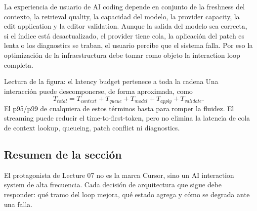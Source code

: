 La experiencia de usuario de AI coding depende en conjunto de la freshness del contexto, la retrieval quality, la capacidad del modelo, la provider capacity, la edit application y la editor validation. Aunque la salida del modelo sea correcta, si el índice está desactualizado, el provider tiene cola, la aplicación del patch es lenta o los diagnostics se traban, el usuario percibe que el sistema falla. Por eso la optimización de la infraestructura debe tomar como objeto la interaction loop completa.


\begin{knowledgebox}{Lectura de la figura: el latency budget pertenece a toda la cadena}
Una interacción puede descomponerse, de forma aproximada, como
\[
T_{total}=T_{context}+T_{queue}+T_{model}+T_{apply}+T_{validate}.
\]
El p95/p99 de cualquiera de estos términos basta para romper la fluidez. El streaming puede reducir el time-to-first-token, pero no elimina la latencia de cola de context lookup, queueing, patch conflict ni diagnostics.
\end{knowledgebox}


\subsection{Resumen de la sección}

El protagonista de Lecture 07 no es la marca Cursor, sino un AI interaction system de alta frecuencia. Cada decisión de arquitectura que sigue debe responder: qué tramo del loop mejora, qué estado agrega y cómo se degrada ante una falla.
